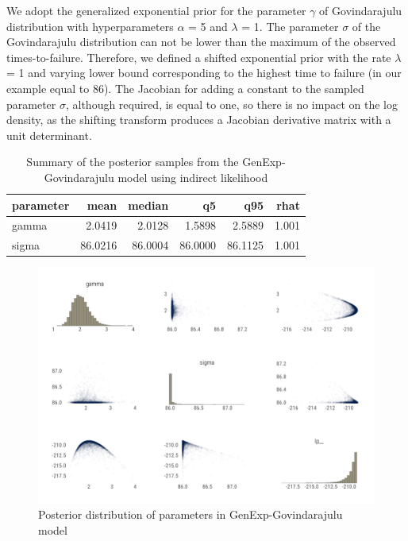 \documentclass[
  12pt,
]{article}
\begin{document}
We adopt the generalized exponential prior for the parameter \(\gamma\) of Govindarajulu distribution with hyperparameters \(\alpha\) = 5 and \(\lambda\) = 1. The parameter \(\sigma\) of the Govindarajulu distribution can not be lower than the maximum of the observed times-to-failure. Therefore, we defined a shifted exponential prior with the rate \(\lambda\) = 1 and varying lower bound corresponding to the highest time to failure (in our example equal to 86). The Jacobian for adding a constant to the sampled parameter \(\sigma\), although required, is equal to one, so there is no impact on the log density, as the shifting transform produces a Jacobian derivative matrix with a unit determinant.

\begin{table}[!h]

\caption{\label{tab:govi-tab}Summary of the posterior samples from the GenExp-Govindarajulu model using indirect likelihood}
\centering
\begin{tabular}[t]{lrrrrr}
\toprule
parameter & mean & median & q5 & q95 & rhat\\
\midrule
gamma & 2.0419 & 2.0128 & 1.5898 & 2.5889 & 1.001\\
sigma & 86.0216 & 86.0004 & 86.0000 & 86.1125 & 1.001\\
\bottomrule
\end{tabular}
\end{table}

\begin{figure}

{\centering \includegraphics[width=0.8\linewidth]{ilbm_article_files/figure-latex/govi-pairs-graph-1} 

}

\caption{Posterior distribution of parameters in GenExp-Govindarajulu model}\label{fig:govi-pairs-graph}
\end{figure}
\end{document}
